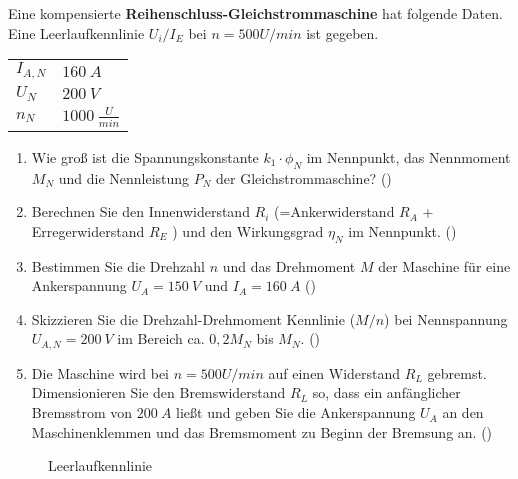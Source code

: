 \begin{question}[topic=gsm,name={18.1.2017},type=exam,tags={20170118}]
	Eine kompensierte \textbf{Reihenschluss-Gleichstrommaschine} hat folgende Daten. Eine Leerlaufkennlinie $U_i/I_E$ bei $n=500 U/min$ ist gegeben.\\
	\begin{tabular}{L{2cm}l}
		$I_{A,N}$ \dotfill &$160~A$\\
		$U_{N}$ \dotfill & $200~V$ \\
		$n_N$ \dotfill & $1000~\frac{U}{min}$\\
	\end{tabular}
	\begin{enumerate}
		\item Wie groß ist die Spannungskonstante $k_1 \cdot \phi_N$ im Nennpunkt, das Nennmoment $M_N$ und die Nennleistung $P_N$ der Gleichstrommaschine? ()
		\item Berechnen Sie den Innenwiderstand $R_i$ (=Ankerwiderstand $R_A$ + Erregerwiderstand $R_E$ ) und den Wirkungsgrad $\eta_N$ im Nennpunkt. ()
		\item Bestimmen Sie die Drehzahl $n$ und das Drehmoment $M$ der Maschine für eine Ankerspannung $U_A =150~V$ und $I_A = 160~A$ ()
		\item Skizzieren Sie die Drehzahl-Drehmoment Kennlinie ($M/n$) bei Nennspannung $U_{A,N}=200~V$ im Bereich ca. $0,2M_N$ bis $M_N$. ()
		\item Die Maschine wird bei $n=500 U/min$ auf einen Widerstand $R_L$ gebremst. Dimensionieren Sie den Bremswiderstand $R_L$ so, dass ein anfänglicher Bremsstrom von $200~A$ ließt und geben Sie die Ankerspannung $U_A$ an den Maschinenklemmen und das Bremsmoment zu Beginn der Bremsung an. ()
	\end{enumerate}
	\begin{figure}[H]
		\caption{Leerlaufkennlinie} \label{fig:20170118}
	\end{figure}
\end{question}
\begin{solution}
	
\end{solution}